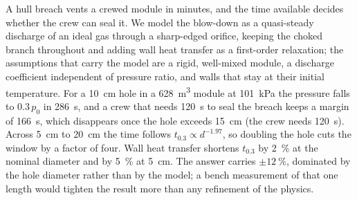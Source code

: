 \begin{titlepage}
{\setlength{\leftskip}{0.05\textwidth}%
 \setlength{\rightskip}{0.05\textwidth}%
 \setlength{\parindent}{0pt}%
A hull breach vents a crewed module in minutes, and the time available
decides whether the crew can seal it. We model the blow-down as a
quasi-steady discharge of an ideal gas through a sharp-edged orifice,
keeping the choked branch throughout and adding wall heat transfer as a
first-order relaxation; the assumptions that carry the model are a rigid,
well-mixed module, a discharge coefficient independent of pressure ratio,
and walls that stay at their initial temperature. For a \SI{10}{cm} hole
in a \SI{628}{m^3} module at \SI{101}{kPa} the pressure falls to
$0.3\,p_0$ in \SI{286}{s}, and a crew that needs \SI{120}{s} to seal the
breach keeps a margin of \SI{166}{s}, which disappears once the hole
exceeds \SI{15}{cm} (the crew needs \SI{120}{s}). Across \SI{5}{cm} to \SI{20}{cm} the time follows
$t_{0.3}\propto d^{-1.97}$, so doubling the hole cuts the window by a
factor of four. Wall heat transfer shortens $t_{0.3}$ by \SI{2}{\percent}
at the nominal diameter and by \SI{5}{\percent} at \SI{5}{cm}. The answer
carries $\pm\SI{12}{\percent}$, dominated by the hole diameter rather than
by the model; a bench measurement of that one length would tighten the
result more than any refinement of the physics.
\par}

\vfill
\end{titlepage}
\setcounter{page}{2}%
